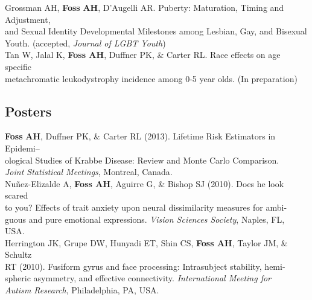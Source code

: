\documentclass[margin]{res}
\begin{document}
\begin{resume}
\begin{tabbing}
  Grossman AH, {\bf Foss} {\bf AH}, D'Augelli AR. 
  Puberty: Maturation, Timing and Adjustment, \\
  \> and Sexual Identity Developmental Milestones among Lesbian, Gay, and Bisexual  \\
  \> Youth. (accepted, {\it Journal of LGBT Youth}) \\

%
 Tan W, Jalal K, {\bf Foss AH}, Duffner PK, \& Carter RL. Race
 effects on age specific\\
 \> metachromatic leukodystrophy incidence
 among 0-5 year olds. (In preparation)
\end{tabbing}


\begin{tabbing}
\section{Posters}

 {\bf Foss} \= {\bf AH}, Duffner PK, \& Carter RL (2013). Lifetime Risk Estimators in Epidemi-- \\
 \> ological Studies of Krabbe Disease: Review and Monte Carlo Comparison. \\
 \> {\it Joint Statistical Meetings}, Montreal, Canada. \\

 Nu\~{n}ez-Elizalde A, {\bf Foss AH}, Aguirre G, \& Bishop SJ 
 (2010). Does he look scared \\
 \> to you? Effects of trait anxiety upon neural dissimilarity 
 measures for ambi-\\
 \> guous and pure emotional expressions. {\it Vision Sciences 
 Society}, Naples, FL,\\
 \> USA.\\

 Herrington JK, Grupe DW, Hunyadi ET, Shin CS, {\bf Foss AH}, 
 Taylor JM, \& Schultz\\
 \> RT (2010). Fusiform gyrus and face processing: Intrasubject 
 stability, hemi-\\
 \> spheric asymmetry, and effective connectivity. {\it 
 International Meeting for}\\
 \> {\it Autism Research}, Philadelphia, PA, USA.\\


\end{tabbing}
\end{resume}
\end{document}
